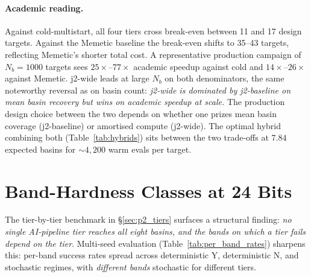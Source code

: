 \paragraph{Academic reading.}
Against cold-multistart, all four tiers cross break-even between 11
and 17 design targets. Against the Memetic baseline the break-even
shifts to 35--43 targets, reflecting Memetic's shorter total cost.
A representative production campaign of $N_b = 1000$ targets sees
$25\times$--$77\times$ academic speedup against cold and
$14\times$--$26\times$ against Memetic. j2-wide leads at large $N_b$
on both denominators, the same noteworthy reversal as on basin
count: \emph{j2-wide is dominated by j2-baseline on mean basin
recovery but wins on academic speedup at scale.} The production
design choice between the two depends on whether one prizes mean
basin coverage (j2-baseline) or amortised compute (j2-wide). The
optimal hybrid combining both (Table~\ref{tab:hybrids}) sits
between the two trade-offs at $7.84$ expected basins for $\sim
4{,}200$ warm evals per target.


\section{Band-Hardness Classes at 24 Bits}\label{sec:p2_hardness}

The tier-by-tier benchmark in \S\ref{sec:p2_tiers} surfaces a structural
finding: \emph{no single AI-pipeline tier reaches all eight basins,
and the bands on which a tier fails depend on the tier}. Multi-seed
evaluation (Table~\ref{tab:per_band_rates}) sharpens this: per-band
success rates spread across deterministic Y, deterministic N, and
stochastic regimes, with \emph{different bands} stochastic for
different tiers.

